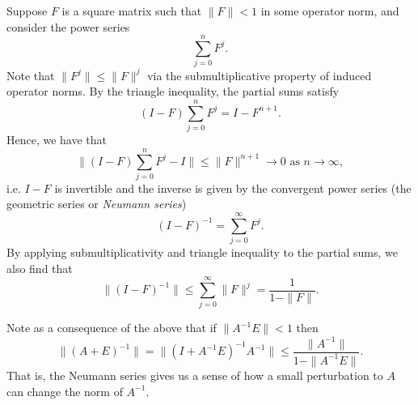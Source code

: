 \documentclass[12pt, leqno]{article}
\begin{document}
Suppose $F$ is a square matrix such that $\|F\| < 1$ in
some operator norm, and consider the power series
\[
  \sum_{j=0}^n F^j.
\]
Note that $\|F^j\| \leq \|F\|^j$ via the submultiplicative property
of induced operator norms.
By the triangle inequality, the partial sums satisfy
\[
  (I-F) \sum_{j=0}^n F^j = I - F^{n+1}.
\]
Hence, we have that
\[
  \|(I-F) \sum_{j=0}^n F^j - I\| \leq \|F\|^{n+1} \rightarrow 0
  \mbox{ as } n \rightarrow \infty,
\]
i.e. $I-F$ is invertible and the inverse is given by the convergent
power series (the geometric series or {\em Neumann series})
\[
  (I-F)^{-1} = \sum_{j=0}^\infty F^j.
\]
By applying submultiplicativity and triangle inequality to the partial
sums, we also find that
\[
  \|(I-F)^{-1}\| \leq \sum_{j=0}^\infty \|F\|^j = \frac{1}{1-\|F\|}.
\]

Note as a consequence of the above that if $\|A^{-1} E\| < 1$ then
\[
  \|(A+E)^{-1}\|
  = \|(I+A^{-1} E)^{-1} A^{-1}\|
  \leq \frac{\|A^{-1}\|}{1-\|A^{-1} E\|}.
\]
That is, the Neumann series gives us a sense of how a small
perturbation to $A$ can change the norm of $A^{-1}$.



\end{document}
